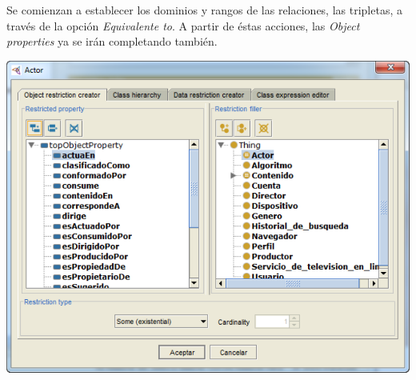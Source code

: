 \documentclass[a4paper,10pt,spanish,oneside]{article}
\begin{document}
\begin{minipage}{0.3\linewidth}

Se comienzan a establecer los dominios y rangos de las relaciones, las tripletas, a través de la opción \textit{Equivalente to}. A partir de éstas acciones, las \textit{Object properties} ya se irán completando también.

\end{minipage} \hfill \begin{minipage}{0.65\linewidth}

\begin{center}
\includegraphics[width=\linewidth]{5}
\end{center}

\end{minipage}
\end{document}
